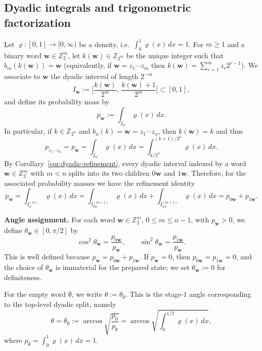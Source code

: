 \documentclass{article}
\numberwithin{equation}{section}
\begin{document}
\subsection{Dyadic integrals and trigonometric factorization}\label{subsec:factorization}

Let $\varrho:[0,1]\to[0,\infty)$ be a density, i.e.\ $\int_0^1 \varrho(x)\,dx=1$.
For $m\ge 1$ and a binary word $\mathbf{w}\in\mathbb{Z}_2^{m}$, let $k(\mathbf{w})\in\mathbb{Z}_{2^m}$ be the unique
integer such that $b_m(k(\mathbf{w}))=\mathbf{w}$ (equivalently, if $\mathbf{w}=z_1\cdots z_m$ then $k(\mathbf{w})=\sum_{r=1}^{m} z_r2^{r-1}$).
We associate to $\mathbf{w}$ the dyadic interval of length $2^{-m}$
\[
I_{\mathbf{w}}:=\Big[\frac{k(\mathbf{w})}{2^{m}},\,\frac{k(\mathbf{w})+1}{2^{m}}\Big]\subset[0,1],
\]
and define its probability mass by
\[
p_{\mathbf{w}}:=\int_{I_w}\varrho(x)\,dx.
\]
In particular, if $k\in\mathbb{Z}_{2^n}$ and $b_n(k)=\mathbf{w}=z_1\cdots z_n$, then $k(\mathbf{w})=k$ and thus
\[
p_{z_1\cdots z_n}=p_{\mathbf{w}}=\int_{I_w}\varrho(x)\,dx=\int_{k/2^n}^{(k+1)/2^n}\varrho(x)\,dx.
\]
By Corollary~\ref{cor:dyadic-refinement}, every dyadic interval indexed by a word
$\mathbf{w}\in\mathbb{Z}_2^{m}$ with $m<n$ splits into its two children $0\mathbf{w}$ and $1\mathbf{w}$. Therefore, for the associated
probability masses we have the refinement identity
\[
p_{\mathbf{w}}=\int_{I^{(m)}_{w}}\varrho(x)\,dx
=\int_{I^{(m+1)}_{0w}}\varrho(x)\,dx+\int_{I^{(m+1)}_{1w}}\varrho(x)\,dx
= p_{0\mathbf{w}}+p_{1\mathbf{w}}.
\]


\medskip
\noindent\textbf{Angle assignment.}
For each word \(\mathbf w\in\mathbb Z_2^m\), \(0\le m\le n-1\), with
\(p_{\mathbf w}>0\), we define \(\theta_{\mathbf w}\in[0,\pi/2]\) by
\[
\cos^2\theta_{\mathbf w}
=
\frac{p_{0\mathbf w}}{p_{\mathbf w}},
\qquad
\sin^2\theta_{\mathbf w}
=
\frac{p_{1\mathbf w}}{p_{\mathbf w}}.
\]
This is well defined because
\(p_{\mathbf w}=p_{0\mathbf w}+p_{1\mathbf w}\). If
\(p_{\mathbf w}=0\), then \(p_{0\mathbf w}=p_{1\mathbf w}=0\), and the
choice of \(\theta_{\mathbf w}\) is immaterial for the prepared state;
we set \(\theta_{\mathbf w}:=0\) for definiteness.

For the empty word \(\emptyset\), we write
\(\theta:=\theta_{\emptyset}\). This is the stage-\(1\) angle
corresponding to the top-level dyadic split, namely
\[
\theta
=
\theta_{\emptyset}
:=
\arccos
\sqrt{\frac{p_0}{p_{\emptyset}}}
=
\arccos
\sqrt{\int_0^{1/2}\varrho(x)\,dx},
\]
where \(p_{\emptyset}=\int_0^1\varrho(x)\,dx=1\).
\end{document}
